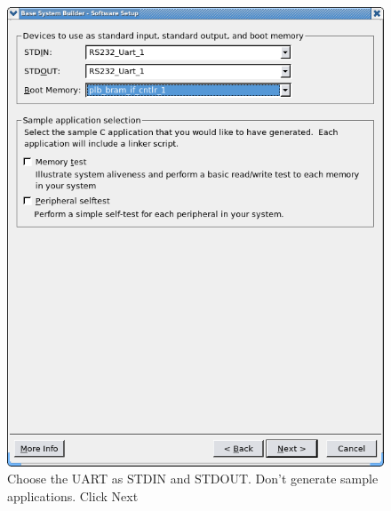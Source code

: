 \documentclass[a4paper,oneside]{memoir}
\begin{document}
\begin{figure}[H]
\centering
\includegraphics[scale=0.4]{BSB9}
\caption{Choose the UART as STDIN and STDOUT. Don't generate sample applications. Click Next\label{fig:BSB9}}
\end{figure}
\end{document}
